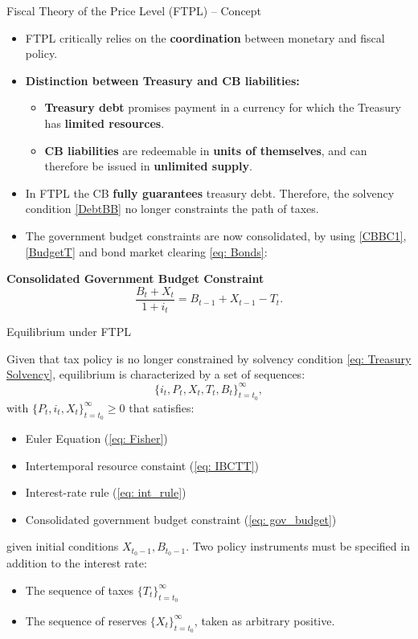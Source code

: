 \documentclass[11pt,aspectratio=169]{beamer}
\begin{document}
\begin{frame}{Fiscal Theory of the Price Level (FTPL) – Concept}
\begin{itemize}
    \item FTPL critically relies on the \textbf{coordination} between monetary and fiscal policy.

    \item \textbf{Distinction between Treasury and CB liabilities:}
  \begin{itemize}
    \item \textbf{Treasury debt} promises payment in a currency for which the Treasury has \textbf{limited resources}.
    \item \textbf{CB liabilities} are redeemable in \textbf{units of themselves}, and can therefore be issued in \textbf{unlimited supply}.
  \end{itemize}
    \vspace{0.15cm}    
    \item In FTPL the CB \textbf{fully guarantees} treasury debt. Therefore, the solvency condition \eqref{DebtBB} no longer constraints the path of taxes.
    \vspace{0.15cm}
    \item The government budget constraints are now consolidated, by using \eqref{CBBC1}, \eqref{BudgetT} and bond market clearing \eqref{eq: Bonds}:
    \end{itemize}
\textbf{Consolidated Government Budget Constraint}
    \begin{equation} \label{eq: gov_budget}
        \frac{B_t + X_t}{1+i_t} = B_{t-1} + X_{t-1} - T_t.
    \end{equation}
\end{frame}

\begin{frame}{Equilibrium under FTPL}


Given that tax policy is no longer constrained by solvency condition \eqref{eq: Treasury Solvency}, equilibrium is characterized by a set of sequences:
\[
\{ i_t, P_t, X_t, T_t, B_t \}_{t=t_0}^\infty,
\]
with $\{P_t, i_t, X_t \}_{t=t_0}^\infty \geq 0$ that satisfies:
\begin{itemize}
  \item Euler Equation (\ref{eq: Fisher})
  \item Intertemporal resource constaint (\ref{eq: IBCTT})
  \item Interest-rate rule (\ref{eq: int_rule})
  \item Consolidated government budget constraint (\ref{eq: gov_budget})
\end{itemize}

given initial conditions $X_{t_0-1}, B_{t_0-1}$.  
\vspace{0.3cm}
\break
Two policy instruments must be specified in addition to the interest rate:
\begin{itemize}
  \item The sequence of taxes $\{T_t\}_{t=t_0}^\infty$
  \item The sequence of reserves $\{X_t\}_{t=t_0}^\infty$, taken as arbitrary positive.
\end{itemize}

\end{frame}
\end{document}
